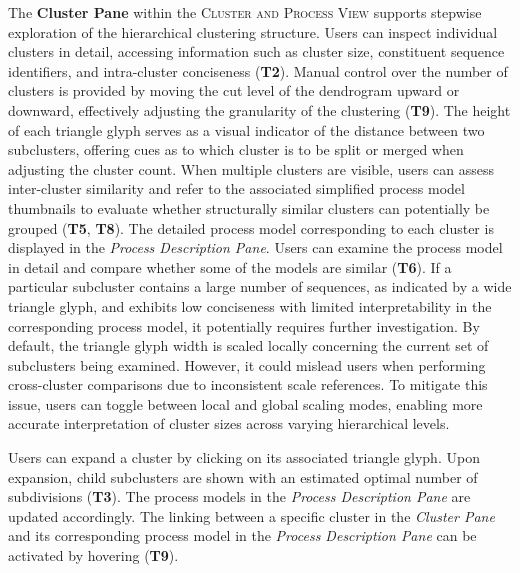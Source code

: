 \documentclass[preprint,journal]{vgtc}            %
\begin{document}
The \textbf{Cluster Pane} within the \textsc{Cluster and Process View} supports stepwise exploration of the hierarchical clustering structure. 
Users can inspect individual clusters in detail, accessing information such as cluster size, constituent sequence identifiers, and intra-cluster conciseness (\textbf{T2}).
Manual control over the number of clusters is provided by moving the cut level of the dendrogram upward or downward, effectively adjusting the granularity of the clustering (\textbf{T9}).
The height of each triangle glyph serves as a visual indicator of the distance between two subclusters, offering cues as to which cluster is to be split or merged when adjusting the cluster count.
When multiple clusters are visible, users can assess inter-cluster similarity and refer to the associated simplified process model thumbnails to evaluate whether structurally similar clusters can potentially be grouped (\textbf{T5}, \textbf{T8}).
The detailed process model corresponding to each cluster is displayed in the \textit{Process Description Pane}.
Users can examine the process model in detail and compare whether some of the models are similar (\textbf{T6}).
If a particular subcluster contains a large number of sequences, as indicated by a wide triangle glyph, and exhibits low conciseness with limited interpretability in the corresponding process model, it potentially requires further investigation.
By default, the triangle glyph width is scaled locally concerning the current set of subclusters being examined.
However, it could mislead users when performing cross-cluster comparisons due to inconsistent scale references.
To mitigate this issue, users can toggle between local and global scaling modes, enabling more accurate interpretation of cluster sizes across varying hierarchical levels.

Users can expand a cluster by clicking on its associated triangle glyph.
Upon expansion, child subclusters are shown with an estimated optimal number of subdivisions (\textbf{T3}).
The process models in the \textit{Process Description Pane} are updated accordingly.
The linking between a specific cluster in the \textit{Cluster Pane} and its corresponding process model in the \textit{Process Description Pane} can be activated by hovering (\textbf{T9}).
\end{document}
